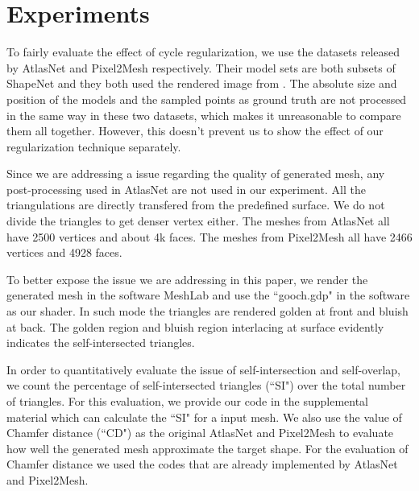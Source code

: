 \section{Experiments}
 To fairly evaluate the effect of cycle regularization, we use the datasets released by AtlasNet and Pixel2Mesh respectively. Their model sets are both subsets of ShapeNet\cite{shapenetdata} and they both used the rendered image from \cite{3DR2N2}. The absolute size and position of the models and the sampled points as ground truth are not processed in the same way in these two datasets, which makes it unreasonable to compare them all together. However, this doesn't prevent us to show the effect of our regularization technique separately.

 Since we are addressing a issue regarding the quality of generated mesh, any post-processing used in AtlasNet\cite{atlasnet} are not used in our experiment. All the triangulations are directly transfered from the predefined surface. We do not divide the triangles to get denser vertex either. The meshes from AtlasNet all have 2500 vertices and about 4k faces. The meshes from Pixel2Mesh all have 2466 vertices and 4928 faces.

To better expose the issue we are addressing in this paper, we render the generated mesh in the software MeshLab and use the ``gooch.gdp" in the software as our shader. In such mode the triangles are rendered golden at front and bluish at back. The golden region and bluish region interlacing at surface evidently indicates the self-intersected triangles.

In order to quantitatively evaluate the issue of self-intersection and self-overlap, we count the percentage of self-intersected triangles (``SI") over the total number of triangles. For this evaluation, we provide our code in the supplemental material which can calculate the ``SI" for a input mesh.  
We also use the value of Chamfer distance (``CD") as the original AtlasNet and Pixel2Mesh to evaluate how well the generated mesh approximate the target shape. For the evaluation of Chamfer distance we used the codes that are already implemented by AtlasNet\cite{atlasnet} and Pixel2Mesh\cite{pixel2mesh}.

